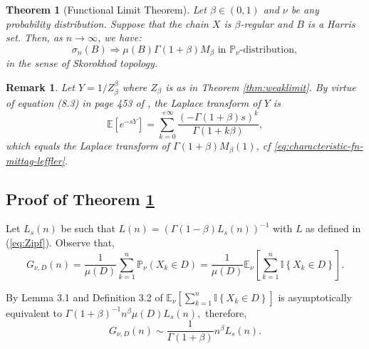 \documentclass[sn-mathphys-ay]{sn-jnl}%
\newtheorem{theorem}{Theorem}[section]%
\newtheorem{remark}{Remark}%
\renewcommand{\P}{\mathbb{P}}
\newcommand{\E}{\mathbb{E}}
\begin{document}
\begin{appendices}
\begin{theorem}[Functional Limit Theorem]\label{thm:funclimit}
    Let $\beta\in(0,1)$ and $\nu$ be any probability distribution. Suppose that the
    chain $X$ is $\beta$-regular and \(B\) is a Harris set. Then, as \(n\to\infty\), we have:
    \begin{equation*}
        \sigma_{n}(B) \Rightarrow \mu(B) \Gamma \left(1+\beta \right){M_\beta }\text{ in } \mathbb{P}_{\nu}\text{-distribution},
    \end{equation*}
    in the sense of Skorokhod topology.
\end{theorem}

\begin{remark} Let \(Y=1/Z_\beta^\beta\) where \(Z_\beta\) is as in Theorem \ref{thm:weaklimit}. By virtue of equation (8.3) in page 453 of \cite{Feller1971}, the Laplace transform of \(Y\) is
    \begin{equation*}
        \mathbb{E}\left[ {{e^{ - sY}}} \right] = \sum\limits_{k = 0}^{ + \infty } {\frac{{{{\left( { - \Gamma \left( {1 + \beta } \right)s} \right)}^k}}}{{\Gamma \left( {1 + k\beta } \right)}}},
    \end{equation*}
    which equals the Laplace transform of \(\Gamma \left( {1 + \beta } \right){M_\beta
    }\left( 1 \right)\),\; \textit{cf} \eqref{eq:characteristic-fn-mittag-leffler}.
\end{remark}

\subsection{Proof of Theorem \ref{thm:funclimit}}

Let \(L_s\left(n\right)\) be such that $ L\left( n \right) = {(\Gamma \left( {1 -
        \beta } \right){L_s}\left( n \right))}^{-1}$ with \(L\) as defined in
(\ref{eq:Zipf}). Observe that,
\begin{equation*}
    {G_{\nu ,D}}\left( n \right) = \frac{1}{{\mu \left( D \right)}}\sum\limits_{k = 1}^n {{\P_\nu }\left( {{X_k} \in D} \right)}  = \frac{1}{{\mu \left( D \right)}}{\E_\nu }\left[ {\sum\limits_{k = 1}^n {\mathbb{I}\left\{ {{X_k} \in D} \right\}} } \right].
\end{equation*}

By Lemma 3.1 and Definition 3.2 of \cite{Tjostheim-2001} ${\E_\nu }\left[ {\sum_{k =
        1}^n {\mathbb{I}\left\{ {{X_k} \in D} \right\}} } \right]$ is asymptotically
equivalent to $\Gamma \left( {1 + \beta } \right)^{-1}{n^\beta }\mu \left( D
    \right){L_s}\left( n \right),$ therefore,
\begin{equation}\label{green_function_limit}
    {G_{\nu ,D}}\left( n \right) \sim \frac{1}{{\Gamma \left( {1 + \beta } \right)}}{n^\beta }{L_s}\left( n \right).
\end{equation}


\end{appendices}
\end{document}
